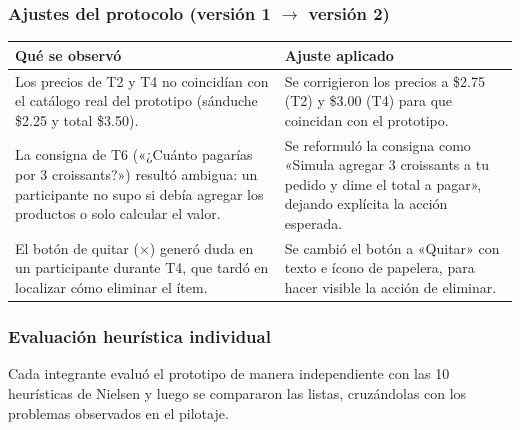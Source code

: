 \documentclass{article}
\begin{document}
\subsubsection{Ajustes del protocolo (versión 1 $\rightarrow$ versión 2)}
\begin{center}
\small
\begin{tabular}{|p{6.4cm}|p{6.4cm}|}
\hline
\textbf{Qué se observó} & \textbf{Ajuste aplicado} \\
\hline
Los precios de T2 y T4 no coincidían con el catálogo real del prototipo (sánduche \$2.25 y total \$3.50). & Se corrigieron los precios a \$2.75 (T2) y \$3.00 (T4) para que coincidan con el prototipo. \\
\hline
La consigna de T6 («¿Cuánto pagarías por 3 croissants?») resultó ambigua: un participante no supo si debía agregar los productos o solo calcular el valor. & Se reformuló la consigna como «Simula agregar 3 croissants a tu pedido y dime el total a pagar», dejando explícita la acción esperada. \\
\hline
El botón de quitar ($\times$) generó duda en un participante durante T4, que tardó en localizar cómo eliminar el ítem. & Se cambió el botón a «Quitar» con texto e ícono de papelera, para hacer visible la acción de eliminar. \\
\hline
\end{tabular}
\end{center}

\subsubsection{Evaluación heurística individual}
Cada integrante evaluó el prototipo de manera independiente con las 10 heurísticas de Nielsen y luego se compararon las listas, cruzándolas con los problemas observados en el pilotaje.
\end{document}
